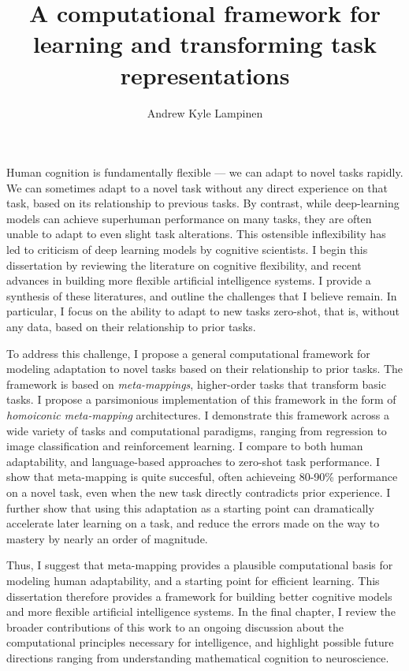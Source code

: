 \documentclass{report}
\begin{document}
\title{A computational framework for learning and transforming task representations}
\author{Andrew Kyle Lampinen}

\beforepreface
\setcounter{page}{4}  %

Human cognition is fundamentally flexible --- we can adapt to novel tasks rapidly. We can sometimes adapt to a novel task without any direct experience on that task, based on its relationship to previous tasks. By contrast, while deep-learning models can achieve superhuman performance on many tasks, they are often unable to adapt to even slight task alterations. This ostensible inflexibility has led to criticism of deep learning models by cognitive scientists. I begin this dissertation by reviewing the literature on cognitive flexibility, and recent advances in building more flexible artificial intelligence systems. I provide a synthesis of these literatures, and outline the challenges that I believe remain. In particular, I focus on the ability to adapt to new tasks zero-shot, that is, without any data, based on their relationship to prior tasks.\par
To address this challenge, I propose a general computational framework for modeling adaptation to novel tasks based on their relationship to prior tasks. The framework is based on \emph{meta-mappings}, higher-order tasks that transform basic tasks. I propose a parsimonious implementation of this framework in the form of \emph{homoiconic meta-mapping} architectures. I demonstrate this framework across a wide variety of tasks and computational paradigms, ranging from regression to image classification and reinforcement learning. I compare to both human adaptability, and language-based approaches to zero-shot task performance. I show that meta-mapping is quite succesful, often achieveing 80-90\% performance on a novel task, even when the new task directly contradicts prior experience. I further show that using this adaptation as a starting point can dramatically accelerate later learning on a task, and reduce the errors made on the way to mastery by nearly an order of magnitude. \par
Thus, I suggest that meta-mapping provides a plausible computational basis for modeling human adaptability, and a starting point for efficient learning. This dissertation therefore provides a framework for building better cognitive models and more flexible artificial intelligence systems. In the final chapter, I review the broader contributions of this work to an ongoing discussion about the computational principles necessary for intelligence, and highlight possible future directions ranging from understanding mathematical cognition to neuroscience. 
\end{document}
